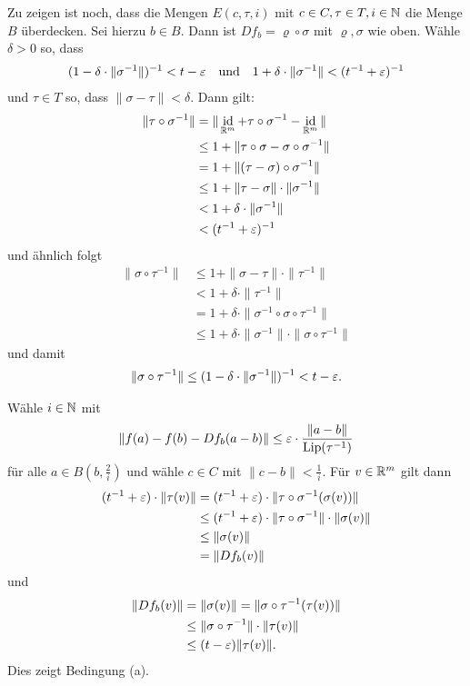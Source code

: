 \documentclass[a4paper,twoside,DIV15,BCOR12mm]{scrbook}
\DeclareMathOperator{\id}{id}
\DeclareMathOperator{\Lip}{Lip}
\begin{document}
\begin{beweis}
Zu zeigen ist noch, dass die Mengen $E(c,\tau,i)$ mit $c\in C, \tau\in T,i\in \mathbb{N}$ die Menge $B$ überdecken. Sei hierzu $b\in B$. Dann ist $Df_b = \varrho \circ \sigma$ mit $\varrho, \sigma$ wie oben. Wähle $\delta>0$ so, dass
\begin{align*}
(1-\delta\cdot\|\sigma^{-1}\|)^{-1} < t - \varepsilon \quad\text{und} \quad 1+\delta\cdot\|\sigma^{-1}\| < (t^{-1}+\varepsilon)^{-1}
\end{align*}
und $\tau\in T$ so, dass $\|\sigma-\tau\|< \delta$. Dann gilt:
\begin{align*}
\|\tau\circ\sigma^{-1}\| 
&= \|\id_{\MdR^m}+\tau \circ \sigma^{-1} - \id_{\MdR^m} \|\\
&\le 1 + \| \tau \circ \sigma - \sigma\circ \sigma^{-1}\| \\
&=   1 + \|(\tau -\sigma)\circ \sigma^{-1}\| \\
&\le 1 + \|\tau -\sigma\|\cdot\|\sigma^{-1}\| \\
&<  1+\delta\cdot\|\sigma^{-1}\| \\
&< (t^{-1}+\ep)^{-1}
\end{align*}
und ähnlich folgt
\begin{align*}
\|\sigma\circ\tau^{-1}\| &\le 1 + \|\sigma - \tau\| \cdot \|\tau^{-1}\| \\
&< 1 + \delta\cdot\|\tau^{-1}\| \\
&= 1+\delta\cdot\|\sigma^{-1} \circ \sigma\circ\tau^{-1}\| \\
&\le 1 + \delta\cdot\|\sigma^{-1}\|\cdot \|\sigma\circ\tau^{-1}\| 
\end{align*}
und damit
\begin{align*}
\|\sigma\circ\tau^{-1}\| \le (1-\delta\cdot\|\sigma^{-1}\|)^{-1} < t-\varepsilon.
\end{align*}

Wähle $i\in\mathbb{N}$ mit
\begin{align*}
\|f(a)-f(b) - Df_b(a-b)\| \le \ep \cdot \frac{\|a-b\|}{\Lip(\tau^{-1})}
\end{align*}
für alle $a\in B(b,\frac2i)$ und wähle $c\in C$ mit $\|c-b\| < \frac1i$. Für $v\in\mathbb{R}^m$ gilt dann
\begin{align*}
(t^{-1} + \varepsilon)\cdot \|\tau(v)\| 
&= (t^{-1} + \varepsilon)\cdot \|\tau\circ\sigma^{-1}(\sigma(v))\| \\
&\le (t^{-1} + \varepsilon)\cdot \|\tau\circ\sigma^{-1}\| \cdot \|\sigma(v)\| \\
&\le \|\sigma(v)\| \\
&= \|Df_b(v)\|
\end{align*}
und
\begin{align*}
\|Df_b(v)\| &= \|\sigma(v)\| = \|\sigma\circ\tau^{-1}(\tau(v))\| \\
&\le \|\sigma\circ\tau^{-1}\| \cdot \|\tau(v)\| \\
&\le (t-\varepsilon)\|\tau(v)\|.
\end{align*}
Dies zeigt Bedingung (a).


\end{beweis}
\end{document}
